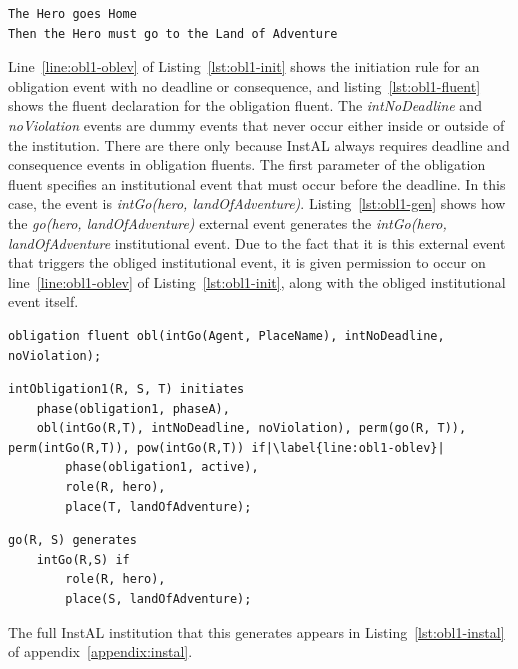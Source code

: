 \documentclass[11pt]{report}
\begin{document}
\begin{lstlisting}
The Hero goes Home
Then the Hero must go to the Land of Adventure
\end{lstlisting}

Line~\ref{line:obl1-oblev} of Listing~\ref{lst:obl1-init} shows the
initiation rule for an obligation event with no deadline or consequence, and
listing~\ref{lst:obl1-fluent} shows the fluent declaration for the obligation
fluent. The \emph{intNoDeadline} and \emph{noViolation} events are dummy events
that never occur either inside or outside of the institution. There are there
only because InstAL always requires deadline and consequence events in
obligation fluents.
The first parameter of the obligation fluent specifies an institutional event
that must occur before the deadline. In this case, the event is
\emph{intGo(hero, landOfAdventure)}. Listing~\ref{lst:obl1-gen} shows how the
\emph{go(hero, landOfAdventure)} external event generates the \emph{intGo(hero,
  landOfAdventure} institutional event. Due to the fact that it is this external
event that triggers the obliged institutional event, it is given permission
to occur on line~\ref{line:obl1-oblev} of Listing~\ref{lst:obl1-init}, along with
the obliged institutional event itself.

\begin{lstlisting}[label={lst:obl1-fluent}, caption={Fluent declaration for the
obligation event in Listing~\ref{lst:obl1}}]
obligation fluent obl(intGo(Agent, PlaceName), intNoDeadline, noViolation);
\end{lstlisting}

\begin{lstlisting}[label={lst:obl1-init}, caption={Initiation rule for the
second (obligation) event of the trope in Listing~\ref{lst:obl1}}, escapechar=|]
intObligation1(R, S, T) initiates
    phase(obligation1, phaseA),
    obl(intGo(R,T), intNoDeadline, noViolation), perm(go(R, T)), perm(intGo(R,T)), pow(intGo(R,T)) if|\label{line:obl1-oblev}|
        phase(obligation1, active),
        role(R, hero),
        place(T, landOfAdventure);
\end{lstlisting}

\begin{lstlisting}[label={lst:obl1-gen}, caption={Generation rule for the
obligation event}]
go(R, S) generates
    intGo(R,S) if
        role(R, hero),
        place(S, landOfAdventure);
\end{lstlisting}

The full InstAL institution that this generates appears in Listing~\ref{lst:obl1-instal} of appendix~\ref{appendix:instal}.
\end{document}
